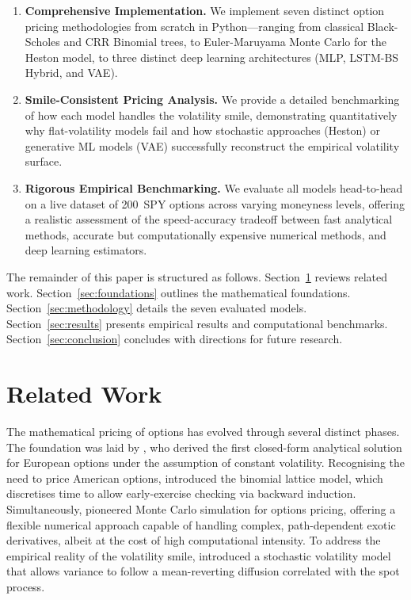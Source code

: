 \documentclass[12pt,a4paper]{article}
\begin{document}
\begin{enumerate}
  \item \textbf{Comprehensive Implementation.} We implement seven distinct option
    pricing methodologies from scratch in Python---ranging from classical
    Black-Scholes and CRR Binomial trees, to Euler-Maruyama Monte Carlo for the
    Heston model, to three distinct deep learning architectures (MLP, LSTM-BS
    Hybrid, and VAE).
  \item \textbf{Smile-Consistent Pricing Analysis.} We provide a detailed
    benchmarking of how each model handles the volatility smile, demonstrating
    quantitatively why flat-volatility models fail and how stochastic approaches
    (Heston) or generative ML models (VAE) successfully reconstruct the empirical
    volatility surface.
  \item \textbf{Rigorous Empirical Benchmarking.} We evaluate all models
    head-to-head on a live dataset of 200~SPY options across varying moneyness
    levels, offering a realistic assessment of the speed-accuracy tradeoff
    between fast analytical methods, accurate but computationally expensive
    numerical methods, and deep learning estimators.
\end{enumerate}

The remainder of this paper is structured as follows.
Section~\ref{sec:related} reviews related work.
Section~\ref{sec:foundations} outlines the mathematical foundations.
Section~\ref{sec:methodology} details the seven evaluated models.
Section~\ref{sec:results} presents empirical results and computational
benchmarks.
Section~\ref{sec:conclusion} concludes with directions for future research.

\section{Related Work}
\label{sec:related}

The mathematical pricing of options has evolved through several distinct phases.
The foundation was laid by \citet{BlackScholes1973}, who derived the first
closed-form analytical solution for European options under the assumption of
constant volatility.
Recognising the need to price American options, \citet{CRR1979} introduced the
binomial lattice model, which discretises time to allow early-exercise checking
via backward induction.
Simultaneously, \citet{Boyle1977} pioneered Monte Carlo simulation for options
pricing, offering a flexible numerical approach capable of handling complex,
path-dependent exotic derivatives, albeit at the cost of high computational
intensity.
To address the empirical reality of the volatility smile, \citet{Heston1993}
introduced a stochastic volatility model that allows variance to follow a
mean-reverting diffusion correlated with the spot process.
\end{document}
